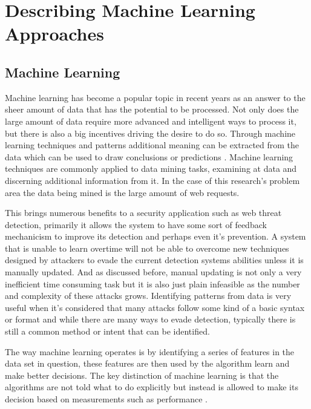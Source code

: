 \chapter{Describing Machine Learning Approaches} \label{sec:sectionFour}

\section{Machine Learning} \label{sec:machineLearning}

Machine learning has become a popular topic in recent years as an answer to the sheer amount of data that has the potential to be processed.  Not only does the large amount of data require more advanced and intelligent ways to process it, but there is also a big incentives driving the desire to do so.  Through machine learning techniques and patterns additional meaning can be extracted from the data which can be used to draw conclusions or predictions \cite{dataManagementSystems}.  Machine learning techniques are commonly applied to data mining tasks, examining at data and discerning additional information from it.  In the case of this research's problem area the data being mined is the large amount of web requests.

This brings numerous benefits to a security application such as web threat detection, primarily it allows the system to have some sort of feedback mechanicism to improve its detection and perhaps even it's prevention.  A system that is unable to learn overtime will not be able to overcome new techniques designed by attackers to evade the current detection systems abilities unless it is manually updated.  And as discussed before, manual updating is not only a very inefficient time consuming task but it is also just plain infeasible as the number and complexity of these attacks grows.  Identifying patterns from data is very useful when it's considered that many attacks follow some kind of a basic syntax or format and while there are many ways to evade detection, typically there is still a common method or intent that can be identified.

The way machine learning operates is by identifying a series of features in the data set in question, these features are then used by the algorithm learn and make better decisions.  The key distinction of machine learning is that the algorithms are not told what to do explicitly but instead is allowed to make its decision based on measurements such as performance \cite{supervisedMachineLearning}.
  
